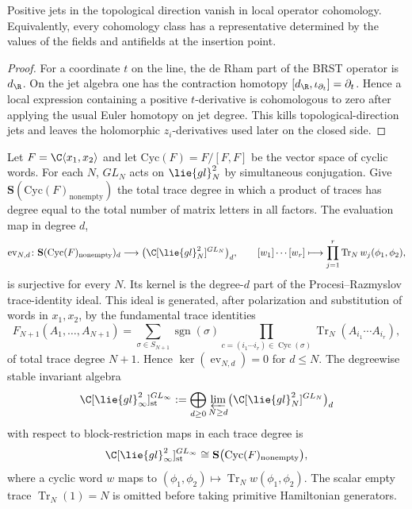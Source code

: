 \documentclass[11pt]{memoir}
\begin{document}
\begin{lem}\label{lem:derivative-jets}
  Positive jets in the topological direction vanish in local
  operator cohomology. Equivalently, every cohomology class has a representative
  determined by the values of the fields and antifields at the insertion point.
\end{lem}

\begin{proof}
  For a coordinate $t$ on the line, the de Rham part of the BRST operator is
  $d_{\R}$. On the jet algebra one has the contraction homotopy
  $[d_{\R},\iota_{\partial_t}]=\partial_t$. Hence a local expression containing
  a positive $t$-derivative is cohomologous to zero after applying the usual
  Euler homotopy on jet degree. This kills topological-direction jets and leaves
  the holomorphic $z_i$-derivatives used later on the closed side.
\end{proof}

\begin{prop}\label{prop:stable-trace-invariants}
  Let \(F=\C\langle x_1,x_2\rangle\) and let
  \(\mathrm{Cyc}(F)=F/[F,F]\) be the vector space of cyclic words.  For
  each \(N\), \(GL_N\) acts on \(\lie{gl}_N^2\) by simultaneous
  conjugation.  Give
  \(\mathbf S(\mathrm{Cyc}(F)_{\mathrm{nonempty}})\) the total trace
  degree in which a product of traces has degree equal to the total
  number of matrix letters in all factors.  The evaluation map in degree
  \(d\),
  \[
    \operatorname{ev}_{N,d}\colon
    \mathbf S(\mathrm{Cyc}(F)_{\mathrm{nonempty}})_d
    \longrightarrow
    \bigl(\C[\lie{gl}_N^2]^{GL_N}\bigr)_d,
    \qquad
    [w_1]\cdots[w_r]\longmapsto
    \prod_{j=1}^r\operatorname{Tr}_N w_j(\phi_1,\phi_2),
  \]
  is surjective for every \(N\).  Its kernel is the degree-\(d\) part of
  the Procesi--Razmyslov trace-identity ideal.  This ideal is generated,
  after polarization and substitution of words in \(x_1,x_2\), by the
  fundamental trace identities
  \[
    F_{N+1}(A_1,\ldots,A_{N+1})
      =
      \sum_{\sigma\in S_{N+1}}
      \operatorname{sgn}(\sigma)
      \prod_{c=(i_1\cdots i_r)\in\operatorname{Cyc}(\sigma)}
      \operatorname{Tr}_N(A_{i_1}\cdots A_{i_r}),
  \]
  of total trace degree \(N+1\).  Hence
  \(\ker(\operatorname{ev}_{N,d})=0\) for \(d\leq N\).  The degreewise
  stable invariant algebra
  \[
    \C[\lie{gl}_\infty^2]^{GL_\infty}_{\mathrm{st}}
      :=
      \bigoplus_{d\geq0}\varprojlim_{N\geq d}
      \bigl(\C[\lie{gl}_N^2]^{GL_N}\bigr)_d
  \]
  with respect to block-restriction maps in each trace degree is
  \[
    \C[\lie{gl}_\infty^2]^{GL_\infty}_{\mathrm{st}}
      \cong\mathbf S\bigl(\mathrm{Cyc}(F)_{\mathrm{nonempty}}\bigr),
  \]
  where a cyclic word \(w\) maps to
  \((\phi_1,\phi_2)\mapsto\operatorname{Tr}_N w(\phi_1,\phi_2)\).  The
  scalar empty trace \(\operatorname{Tr}_N(1)=N\) is omitted before
  taking primitive Hamiltonian generators.
\end{prop}
\end{document}
